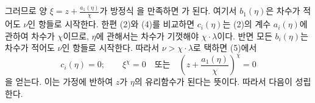 
그러므로 양 $\xi=z+\frac{a_1(\eta)}{\chi}$가 방정식
을 만족하면
가 된다. 여기서 $b_1(\eta)$은 차수가 적어도 $\nu$인 항들로 시작한다. 한편 (2)와 (4)를 비교하면 $c_i(\eta)$는 (2)의 계수 $a_i(\eta)$에 관하여 차수가 $\chi$이므로, $\eta$에 관해서는 차수가 기껏해야 $\chi\cdot\lambda$이다. 반면 모든 $b_i(\eta)$는 차수가 적어도 $\nu$인 항들로 시작한다. 따라서 $\nu>\chi\cdot\lambda$로 택하면 (5)에서
\[
 c_i(\eta)=0;\qquad
 \xi^\chi=0\quad\text{또는}\quad
 \left(z+\frac{a_1(\eta)}{\chi}\right)^\chi=0
\]
을 얻는다. 이는 가정에 반하여 $z$가 $\eta$의 유리함수가 된다는 뜻이다. 따라서 다음이 성립한다.
